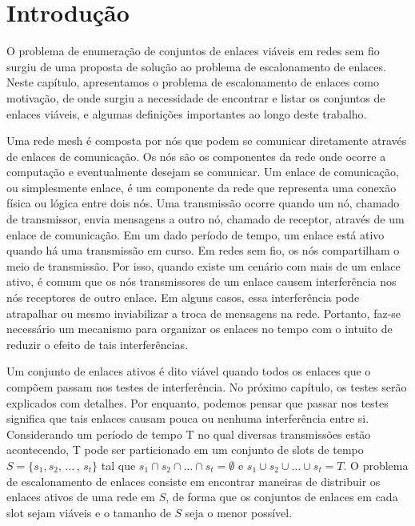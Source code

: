 \chapter{Introdução}
\label{cap:intro}

O problema de enumeração de conjuntos de enlaces viáveis em redes sem fio surgiu de uma proposta de solução ao problema de escalonamento de enlaces. Neste capítulo, apresentamos o problema de escalonamento de enlaces como motivação, de onde surgiu a necessidade de encontrar e listar os conjuntos de enlaces viáveis, e algumas definições importantes ao longo deste trabalho.

Uma rede mesh é composta por nós que podem se comunicar diretamente através de enlaces de comunicação. Os nós são os componentes da rede onde ocorre a computação e eventualmente desejam se comunicar. Um enlace de comunicação, ou simplesmente enlace, é um componente da rede que representa uma conexão física ou lógica entre dois nós.  Uma transmissão ocorre quando um nó, chamado de transmissor, envia mensagens a outro nó, chamado de receptor, através de um enlace de comunicação. Em um dado período de tempo, um enlace está ativo quando há uma transmissão em curso.
Em redes sem fio, os nós compartilham o meio de transmissão. Por isso, quando existe um cenário com mais de um enlace ativo, é comum que os nós transmissores de um enlace causem interferência nos nós receptores de outro enlace. Em alguns casos, essa interferência pode atrapalhar ou mesmo inviabilizar a troca de mensagens na rede. Portanto, faz-se necessário um mecanismo para organizar os enlaces no tempo com o intuito de reduzir o efeito de tais interferências.

Um conjunto de enlaces ativos é dito viável quando todos os enlaces que o compõem passam nos testes de interferência. No próximo capítulo, os testes serão explicados com detalhes. Por enquanto, podemos pensar que passar nos testes significa que tais enlaces causam pouca ou nenhuma interferência entre si.
Considerando um período de tempo T no qual diversas transmissões estão acontecendo, T pode ser particionado em um conjunto de slots de tempo $S=\{s_1, s_2, \, \ldots \, , \, s_t\}$ tal que $s_1 \cap s_2 \cap \ldots \cap s_t = \emptyset$ e $s_1 \cup s_2 \cup \ldots \cup s_t = T$. O problema de escalonamento de enlaces consiste em encontrar maneiras de distribuir os enlaces ativos de uma rede em $S$, de forma que os conjuntos de enlaces em cada slot sejam viáveis e o tamanho  de $S$ seja o menor possível.

